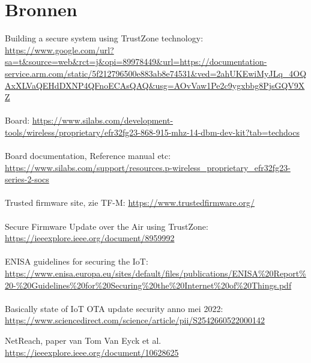 \section{Bronnen}
Building a secure system using TrustZone technology: \url{https://www.google.com/url?sa=t&source=web&rct=j&opi=89978449&url=https://documentation-service.arm.com/static/5f212796500e883ab8e74531&ved=2ahUKEwiMyJLq_4OQAxXLVaQEHdDXNP4QFnoECAsQAQ&usg=AOvVaw1Pe2c9ygxbbg8PjsGQV9XZ}
\\
\\
Board: \url{https://www.silabs.com/development-tools/wireless/proprietary/efr32fg23-868-915-mhz-14-dbm-dev-kit?tab=techdocs}
\\
\\
Board documentation, Reference manual etc: \url{https://www.silabs.com/support/resources.p-wireless_proprietary_efr32fg23-series-2-socs}
\\
\\
Trusted firmware site, zie TF-M: \url{https://www.trustedfirmware.org/}
\\
\\
Secure Firmware Update over the Air using TrustZone: \url{https://ieeexplore.ieee.org/document/8959992}
\\
\\
ENISA guidelines for securing the IoT: \url{https://www.enisa.europa.eu/sites/default/files/publications/ENISA\%20Report\%20-\%20Guidelines\%20for\%20Securing\%20the\%20Internet\%20of\%20Things.pdf}
\\
\\
Basically state of IoT OTA update security anno mei 2022: \url{https://www.sciencedirect.com/science/article/pii/S2542660522000142}

NetReach, paper van Tom Van Eyck et al. \url{https://ieeexplore.ieee.org/document/10628625}